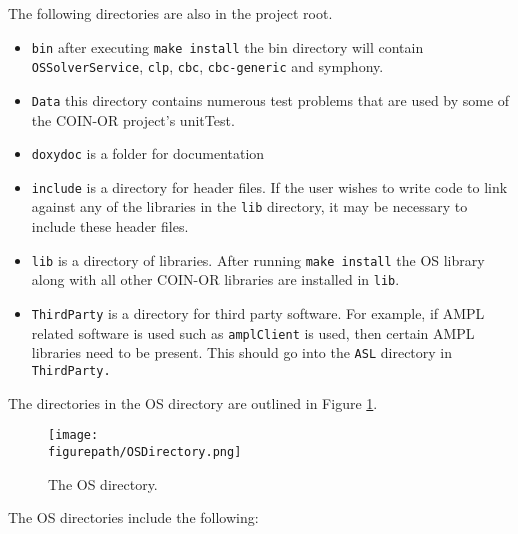 \documentclass[11pt]{article}
\newcommand{\figurepath}{./figures}
\newcounter{Fig}
\renewcommand{\_}{{\char"5F}}
\renewcommand{\{}{{\char"7B}}
\renewcommand{\}}{{\char"7D}}
\renewcommand{\^}{{\char"0D}}
\renewcommand{\'}{{\char"0D}}
\begin{document}
The following directories are also in the project root. 
\begin{itemize}
\item {\tt bin} after executing {\tt make install} the bin directory will contain {\tt OSSolverService}, {\tt clp}, {\tt cbc},  {\tt cbc-generic} and {symphony}.

\item {\tt Data} this directory contains numerous test problems that are used by some of the COIN-OR project's unitTest.

\item {\tt doxydoc} is a folder for documentation

\item {\tt include} is a directory for header files. If the user wishes to write code to link against any of the libraries in the {\tt lib} directory, it may be necessary to include these header files.

\item {\tt lib} is a directory of libraries. After running {\tt make install} the OS library along with all other COIN-OR libraries are installed in {\tt lib}.




\item {\tt ThirdParty} is a  directory for third party software. For example, if AMPL related software is used such as {\tt amplClient} is used, then certain AMPL libraries need to be present. This should go into the {\tt ASL} directory in {\tt ThirdParty.}
\end{itemize}




The directories in the OS directory are outlined in Figure \ref{figure:osdirectory}.


\begin{figure}
\centering
\texttt{[image: \\figurepath/OSDirectory.png]}
\caption{The OS directory.} 
\label{figure:osdirectory}
\end{figure}

The OS directories include the following:
\end{document}
